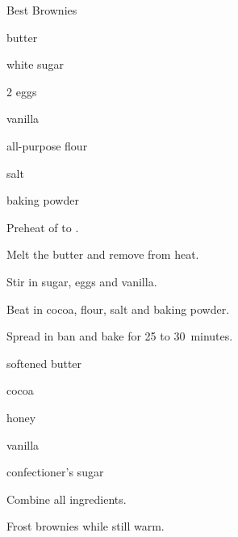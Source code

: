 \begin{recipe}{Best Brownies}{}{}

\begin{ingredients}
\item \C{\half} butter
\item {} white sugar
\item 2 eggs
\item {} vanilla
\item \C{\third} 
\item \C{\half} all-purpose flour
\item \tp{\quarter} salt
\item \tp{\quarter} baking powder
\end{ingredients}

\begin{directions}
\item Preheat of to .
\item Melt the butter and remove from heat.
\item Stir in sugar, eggs and vanilla.
\item Beat in cocoa, flour, salt and baking powder.
\item Spread in ban and bake for 25 to 30~minutes. 
\end{directions}


\begin{ingredients}
\item {} softened butter
\item {} cocoa
\item {} honey
\item {} vanilla
\item {} confectioner's sugar
\end{ingredients}

\begin{directions}
\item Combine all ingredients.
\item Frost brownies while still warm.
\end{directions}
\end{recipe}
